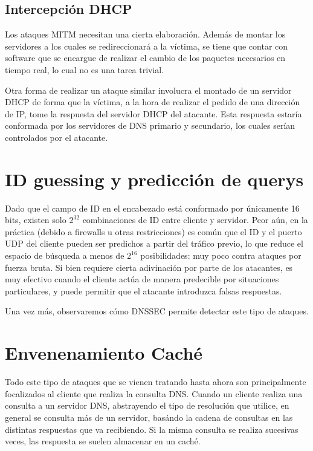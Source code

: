 \subsection{Intercepci\'on DHCP}

Los ataques MITM necesitan una cierta elaboraci\'on. Adem\'as de montar los
servidores a los cuales se redireccionar\'a a la v\'ictima, se tiene que contar
con software que se encargue de realizar el cambio de los paquetes necesarios en
tiempo real, lo cual no es una tarea trivial. 

Otra forma de realizar un ataque similar involucra el montado de un servidor
DHCP de forma que la v\'ictima, a la hora de realizar el pedido de una
direcci\'on de IP, tome la respuesta del servidor DHCP del atacante. Esta
respuesta estar\'ia conformada por los servidores de DNS primario y secundario,
los cuales ser\'ian controlados por el atacante.

\section{ID guessing y predicci\'on de querys}

Dado que el campo de ID en el encabezado est\'a conformado por \'unicamente 16
bits, existen solo $2^{32}$ combinaciones de ID entre cliente y servidor. Peor
a\'un, en la pr\'actica (debido a firewalls u otras restricciones) es com\'un
que el ID y el puerto UDP del cliente pueden ser predichos a partir del
tr\'afico previo, lo que reduce el espacio de b\'usqueda a menos de $2^{16}$
posibilidades: muy poco contra ataques por fuerza bruta. Si bien requiere cierta
adivinaci\'on por parte de los atacantes, es muy efectivo cuando el cliente
act\'ua de manera predecible por situaciones particulares, y puede permitir que
el atacante introduzca falsas respuestas.

Una vez m\'as, observaremos c\'omo DNSSEC permite detectar este tipo de ataques.

\section{Envenenamiento Caché}

Todo este tipo de ataques que se vienen tratando hasta ahora son principalmente
focalizados al cliente que realiza la consulta DNS. Cuando un cliente realiza
una consulta a un servidor DNS, abstrayendo el tipo de resolución que utilice,
en general se consulta más de un servidor, basándo la cadena de consultas en
las distintas respuestas que va recibiendo. Si la misma consulta se realiza
sucesivas veces, las respuesta se suelen almacenar en un caché.

